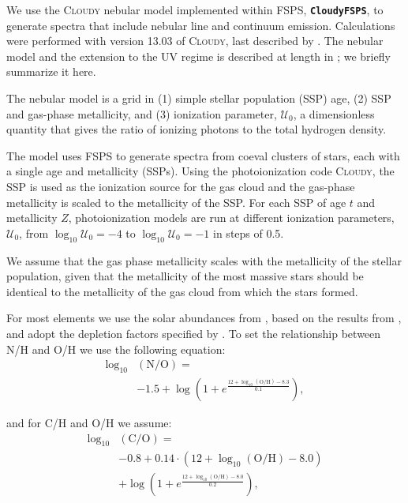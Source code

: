 \documentclass[preprint2]{aastex62}
\newcommand{\FSPS}{{\sc FSPS}\xspace}
\newcommand{\CloudyFSPS}{{\tt \textbf{CloudyFSPS}}\xspace}
\newcommand{\Cloudy}{\textsc{Cloudy}\xspace}
\newcommand{\logten}{\ensuremath{\log_{10}}}
\newcommand{\U}{\ensuremath{\mathcal{U}_{0}}\xspace}
\newcommand{\logUeq}[1]{\ensuremath{\logten \mathcal{U}_0 = #1}}
\begin{document}
We use the \Cloudy nebular model implemented within \FSPS, \CloudyFSPS \citep{cloudyFSPSv1}, to generate spectra that include nebular line and continuum emission. Calculations were performed with version 13.03 of \Cloudy, last described by \citet{Ferland+2013}. The nebular model and the extension to the UV regime is described at length in \citet{Byler+2018}; we briefly summarize it here.

The nebular model is a grid in (1) simple stellar population (SSP) age, (2) SSP and gas-phase metallicity, and (3) ionization parameter, \U, a dimensionless quantity that gives the ratio of ionizing photons to the total hydrogen density.

The model uses \FSPS to generate spectra from coeval clusters of stars, each with a single age and metallicity (SSPs). Using the photoionization code \Cloudy, the SSP is used as the ionization source for the gas cloud and the gas-phase metallicity is scaled to the metallicity of the SSP. For each SSP of age $t$ and metallicity $Z$, photoionization models are run at different ionization parameters, \U, from \logUeq{-4} to \logUeq{-1} in steps of 0.5.

We assume that the gas phase metallicity scales with the metallicity of the stellar population, given that the metallicity of the most massive stars should be identical to the metallicity of the gas cloud from which the stars formed.

For most elements we use the solar abundances from \citet{Grevesse+2010}, based on the results from \citet{Asplund+2009}, and adopt the depletion factors specified by \citet{Dopita+2013}. To set the relationship between N/H and O/H we use the following equation:
\begin{equation}\label{eq:nitrogen}
\begin{aligned}
    \log_{10}&(\mathrm{N}/\mathrm{O}) = \\
    & -1.5 + \log\left( 1 + e^{\frac{12 + \log_{10}(\mathrm{O}/\mathrm{H})-8.3}{0.1}}\right),
\end{aligned}
\end{equation}

and for C/H and O/H we assume:
\begin{equation}\label{eq:carbon}
\begin{aligned}
    \log_{10}&(\mathrm{C}/\mathrm{O}) = \\
    & -0.8 + 0.14\cdot\left(12 + \log_{10}(\mathrm{O}/\mathrm{H})-8.0\right) \\
    & + \log\left( 1 + e^{\frac{12 + \log_{10}(\mathrm{O}/\mathrm{H})-8.0}{0.2}}\right),
\end{aligned}
\end{equation}
\end{document}

